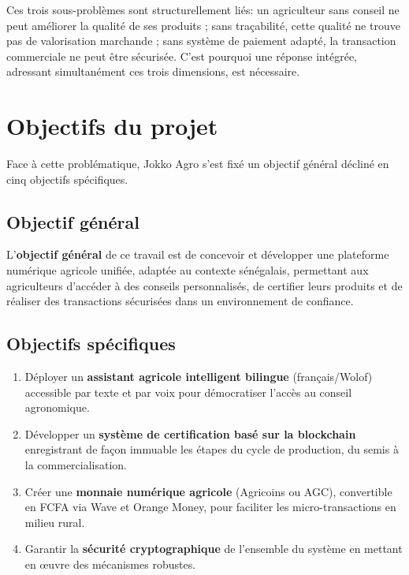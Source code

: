 \documentclass[12pt,a4paper]{report}
\begin{document}
\vspace{0.3cm}

\noindent
Ces trois sous-problèmes sont structurellement liés: un agriculteur sans conseil ne peut améliorer la qualité de ses produits ; sans traçabilité, cette qualité ne trouve pas de valorisation marchande ; sans système de paiement adapté, la transaction commerciale ne peut être sécurisée. C'est pourquoi une réponse intégrée, adressant simultanément ces trois dimensions, est nécessaire.

\vspace{0.5cm}

\section{Objectifs du projet}

\noindent
Face à cette problématique, Jokko Agro s'est fixé un objectif général décliné en cinq objectifs spécifiques.

\vspace{0.4cm}

\subsection{Objectif général}

\noindent
L'\textbf{objectif général} de ce travail est de concevoir et développer une plateforme numérique agricole unifiée, adaptée au contexte sénégalais, permettant aux agriculteurs d'accéder à des conseils personnalisés, de certifier leurs produits et de réaliser des transactions sécurisées dans un environnement de confiance.

\vspace{0.4cm}

\subsection{Objectifs spécifiques}

\begin{tcolorbox}[infobox,title={Objectifs spécifiques}]
  \begin{enumerate}[leftmargin=*,label=\textcolor{bleuUniv}{\textbf{OS\arabic*.}},itemsep=6pt]
    \item Déployer un \textbf{assistant agricole intelligent bilingue} (français/Wolof)
          accessible par texte et par voix pour démocratiser l'accès au conseil
          agronomique.
    \item Développer un \textbf{système de certification basé sur la blockchain}
          enregistrant de façon immuable les étapes du cycle de production, du semis à la
          commercialisation.
    \item Créer une \textbf{monnaie numérique agricole} (Agricoins ou AGC), convertible
          en FCFA via Wave et Orange Money, pour faciliter les micro-transactions en
          milieu rural.
    \item Garantir la \textbf{sécurité cryptographique} de l'ensemble du système en
          mettant en œuvre des mécanismes robustes.
  \end{enumerate}
\end{tcolorbox}
\end{document}
